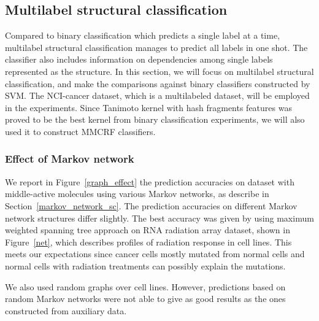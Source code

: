 \documentclass[english]{tktltiki}
\begin{document}
\subsection{Multilabel structural classification}

Compared to binary classification which predicts a single label at a time, multilabel structural classification manages to predict all labels in one shot. The classifier also includes information on dependencies among single labels represented as the structure. In this section, we will focus on multilabel structural classification, and make the comparisons against binary classifiers constructed by SVM. The NCI-cancer dataset, which is a multilabeled dataset, will be employed in the experiments. Since Tanimoto kernel with hash fragments features was proved to be the best kernel from binary classification experiments, we will also used it to construct MMCRF classifiers.

\subsubsection{Effect of Markov network}
We report in Figure~\ref{graph_effect} the prediction accuracies on dataset with middle-active molecules using various Markov networks, as describe in Section~\ref{markov_network_sc}. The prediction accuracies on different Markov network structures differ slightly. The best accuracy was given by using maximum weighted spanning tree approach on RNA radiation array dataset, shown in Figure~\ref{net}, which describes profiles of radiation response in cell lines. This meets our expectations since cancer cells mostly mutated from normal cells and normal cells with radiation treatments can possibly explain the mutations.

We also used random graphs over cell lines. However, predictions based on random Markov networks were not able to give as good results as the ones constructed from auxiliary data.
\end{document}
